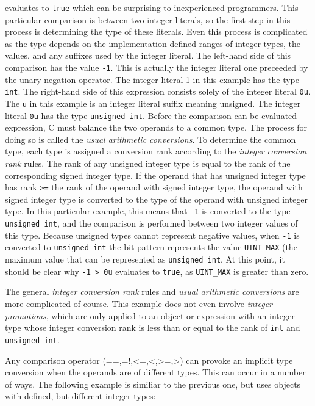 \documentclass[11pt,letterpaper]{article}
\begin{document}
evaluates to \texttt{true} which can be surprising to inexperienced programmers.
This particular comparison is between two integer literals, so the first step in this process is determining the type of these literals.
Even this process is complicated as the type depends on the implementation-defined ranges of integer types, the values, and any suffixes used by the integer literal.
The left-hand side of this comparison has the value \texttt{-1}.
This is actually the integer literal one preceeded by the unary negation operator.
The integer literal 1 in this example has the type \texttt{int}.
The right-hand side of this expression consists solely of the integer literal \texttt{0u}.
The \texttt{u} in this example is an integer literal suffix meaning unsigned.
The integer literal \texttt{0u}  has the type \texttt{unsigned int}.
Before the comparison can be evaluated expression, C must balance the two operands to a common type.
The process for doing so is called the \emph{usual arithmetic conversions}.
To determine the common type, each type is assigned a conversion rank according to the \emph{integer conversion rank} rules.
The rank of any unsigned integer type is equal to the rank of the corresponding signed integer type.
If the operand that has unsigned integer type has rank \texttt{>=} the rank of the operand with signed integer type, the operand with signed integer type is converted to the type of the operand with unsigned integer type.
In this particular example, this means that \texttt{-1} is converted to the type \texttt{unsigned int}, and the comparison is performed between two integer values of this type.
Because unsigned types cannot represent negative values, when \texttt{-1} is converted to \texttt{unsigned int} the bit pattern represents the value \texttt{UINT_MAX} (the maximum value that can be represented as \texttt{unsigned int}.
At this point, it should be clear why \texttt{-1 > 0u} evaluates to \texttt{true}, as \texttt{UINT_MAX} is greater than zero.

The general \emph{integer conversion rank} rules and \emph{usual arithmetic conversions} are more complicated of course.
This example does not even involve \emph{integer promotions}, which are only applied to an object or expression with an integer type whose integer conversion rank is less than or equal to the rank of \texttt{int} and \texttt{unsigned int}.  

Any comparison operator (==,=!,\textless=,\textless,\textgreater=,\textgreater) can provoke an implicit type conversion when the operands are of different types. 
This can occur in a number of ways. 
The following example is similiar to the previous one, but uses objects with defined, but different integer types:
\end{document}
